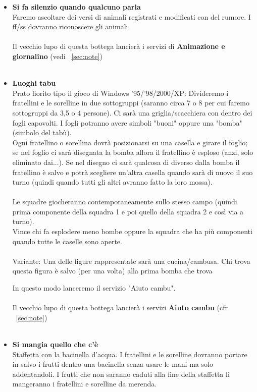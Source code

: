 \documentclass[../main.tex]{subfiles}
\begin{document}
        \begin{itemize}
            \item
            \textbf{Si fa silenzio quando qualcuno parla}\\
                    Faremo ascoltare dei versi di animali registrati e modificati con del rumore. I ff/ss dovranno riconoscere gli animali.\\
                    \\
            Il vecchio lupo di questa bottega lancierà i servizi di \textbf{Animazione e giornalino} (vedi ~\ref{sec:note})\\
            \\
            \item  \textbf{Luoghi tabu}\\
            Prato fiorito tipo il gioco di Windows '95/'98/2000/XP:
            Divideremo i fratellini e le sorelline in due sottogruppi (saranno circa 7 o 8 per cui faremo sottogruppi da 3,5 o 4 persone).
            Ci sarà una griglia/scacchiera con dentro dei fogli capovolti. I fogli potranno avere simboli "buoni" oppure una "bomba" (simbolo del tabù).\\Ogni fratellino o sorellina dovrà posizionarsi su una casella e girare il foglio; se nel foglio ci sarà disegnata la bomba allora il fratellino è esploso (anzi, solo eliminato dai...). Se nel disegno ci sarà qualcosa di diverso dalla bomba il fratellino è salvo e potrà scegliere un'altra casella quando sarà di nuovo il suo turno (quindi quando tutti gli altri avranno fatto la loro mossa).\\
            \\
            Le squadre giocheranno contemporaneamente sullo stesso campo (quindi prima componente della squadra 1 e poi quello della squadra 2 e così via a turno).\\
            Vince chi fa esplodere meno bombe oppure la squadra che ha più componenti quando tutte le caselle sono aperte.\\
            \\
            Variante: Una delle figure rappresentate sarà una cucina/cambusa. Chi trova questa figura è salvo (per una volta) alla prima bomba che trova
            
           In questo modo lanceremo il servizio
           "Aiuto cambu".\\
            \\
            Il vecchio lupo di questa bottega lancierà i servizi \textbf{Aiuto cambu} (cfr ~\ref{sec:note})\\
            \\
        \item
        \textbf{Si mangia quello che c'è}\\
Staffetta con la bacinella d'acqua. I fratellini e le sorelline dovranno portare in salvo i frutti dentro una bacinella senza usare le mani ma solo addentandoli. I frutti che non saranno caduti alla fine della staffetta li mangeranno i fratellini e sorelline da merenda.


\end{itemize}
\end{document}
